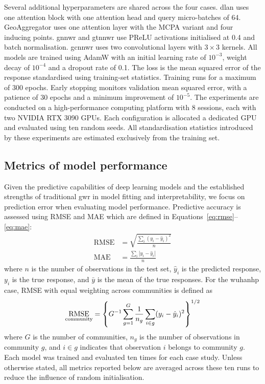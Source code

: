 \documentclass[]{interact}
\newcommand{\DLAN}{\gls{dlan}\xspace}
\newcommand{\GNNWR}{\gls{gnnwr}\xspace}
\newcommand{\GTNNWR}{\gls{gtnnwr}\xspace}
\newcommand{\GCNNWR}{\gls{gcnnwr}\xspace}
\newcommand{\GAgg}{GeoAggregator\xspace}
\newcommand{\WuhanHP}{\gls{wuhanhp}\xspace}
\DeclareMathOperator{\RMSE}{RMSE}
\DeclareMathOperator{\MAE}{MAE}
\begin{document}
Several additional hyperparameters are shared across the four cases.
\DLAN uses one attention block with one attention head and query micro-batches of 64.
\GAgg uses one attention layer with the MCPA variant and four inducing points.
\GNNWR and \GTNNWR use PReLU activations initialised at 0.4 and batch normalisation.
\GCNNWR uses two convolutional layers with $3\times3$ kernels. 
All models are trained using AdamW with an initial learning rate of $10^{-3}$, weight decay of $10^{-4}$ and a dropout rate of 0.1.
The loss is the mean squared error of the response standardised using training-set statistics.
Training runs for a maximum of 300 epochs.
Early stopping monitors validation mean squared error, with a patience of 30 epochs and a minimum improvement of $10^{-5}$.
The experiments are conducted on a high-performance computing platform with 8 sessions, each with two NVIDIA RTX 3090 GPUs.
Each configuration is allocated a dedicated GPU and evaluated using ten random seeds.
All standardisation statistics introduced by these experiments are estimated exclusively from the training set.

\subsection{Metrics of model performance}

Given the predictive capabilities of deep learning models and the established strengths of traditional \gls{gwr} in model fitting and interpretability, we focus on prediction error when evaluating model performance.
Predictive accuracy is assessed using RMSE and MAE which are defined in Equations~\eqref{eq:rmse}--\eqref{eq:mae}:
\begin{align}
  \label{eq:rmse}
  \RMSE & =\sqrt{\frac{\sum_i(y_i-\hat y_i)^2}{n}} \\
  \label{eq:mae}
  \MAE & =\frac{\sum_i|y_i-\hat y_i|}{n}
\end{align}
where $n$ is the number of observations in the test set, $\hat{y}_i$ is the predicted response, $y_i$ is the true response, and $\bar{y}$ is the mean of the true responses.
For the \WuhanHP case, RMSE with equal weighting across communities is defined as
\begin{equation}
  \RMSE_{\rm community}
  =\left\{G^{-1}\sum_{g=1}^{G} \frac{1}{n_g} \sum_{i\in g}(y_i-\hat y_i)^2\right\}^{1/2}
\end{equation}
where $G$ is the number of communities, $n_g$ is the number of observations in community $g$, and $i\in g$ indicates that observation $i$ belongs to community $g$.
Each model was trained and evaluated ten times for each case study.
Unless otherwise stated, all metrics reported below are averaged across these ten runs to reduce the influence of random initialisation.
\end{document}
